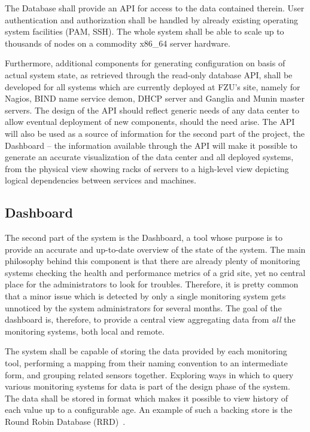 \documentclass{article}
\begin{document}
The Database shall provide an API for access to the data contained therein.  User authentication and authorization shall be
handled by already existing operating system facilities (PAM, SSH).  The whole system shall be able to scale up to thousands of
nodes on a commodity x86\_64 server hardware.

Furthermore, additional components for generating configuration on basis of actual system state, as retrieved through the
read-only database API, shall be developed for all systems which are currently deployed at FZU's site, namely for Nagios, BIND
name service demon, DHCP server and Ganglia and Munin master servers.  The design of the API should reflect generic needs of any
data center to allow eventual deployment of new components, should the need arise.  The API will also be used as a source of
information for the second part of the project, the Dashboard -- the information available through the API will make it possible
to generate an accurate visualization of the data center and all deployed systems, from the physical view showing racks of servers
to a high-level view depicting logical dependencies between services and machines.


\subsection{Dashboard}

The second part of the system is the Dashboard, a tool whose purpose is to provide an accurate and up-to-date overview of the
state of the system.  The main philosophy behind this component is that there are already plenty of monitoring systems checking
the health and performance metrics of a grid site, yet no central place for the administrators to look for troubles.  Therefore,
it is pretty common that a minor issue which is detected by only a single monitoring system gets unnoticed by the system
administrators for several months.  The goal of the dashboard is, therefore, to provide a central view aggregating data from {\em
all} the monitoring systems, both local and remote.

The system shall be capable of storing the data provided by each monitoring tool, performing a mapping from their naming
convention to an intermediate form, and grouping related sensors together.  Exploring ways in which to query various monitoring
systems for data is part of the design phase of the system.  The data shall be stored in format which makes it possible to view
history of each value up to a configurable age.  An example of such a backing store is the Round Robin Database (RRD)~\cite{rrd}.
\end{document}
